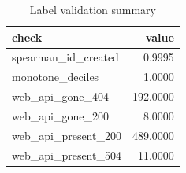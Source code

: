 \begin{table}
\caption{Label validation summary}
\label{tab:tab_label_validation}
\begin{tabular}{lr}
\toprule
check & value \\
\midrule
spearman\_id\_created & 0.9995 \\
monotone\_deciles & 1.0000 \\
web\_api\_gone\_404 & 192.0000 \\
web\_api\_gone\_200 & 8.0000 \\
web\_api\_present\_200 & 489.0000 \\
web\_api\_present\_504 & 11.0000 \\
\bottomrule
\end{tabular}
\end{table}
